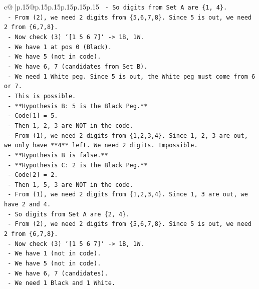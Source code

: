 \documentclass{article}
\begin{document}
{\begin{supertabular}{c@{$\;$}|p{.15\linewidth}@{}p{.15\linewidth}p{.15\linewidth}p{.15\linewidth}p{.15\linewidth}p{.15\linewidth}}
{{{\texttt{        {-}   So digits from Set A are \{1, 4\}.} \\
\texttt{        {-}   From (2), we need 2 digits from \{5,6,7,8\}. Since 5 is out, we need 2 from \{6,7,8\}.} \\
\texttt{        {-}   Now check (3) `{[}1 5 6 7{]}` {-}> 1B, 1W.} \\
\texttt{            {-}   We have 1 at pos 0 (Black).} \\
\texttt{            {-}   We have 5 (not in code).} \\
\texttt{            {-}   We have 6, 7 (candidates from Set B).} \\
\texttt{            {-}   We need 1 White peg. Since 5 is out, the White peg must come from 6 or 7.} \\
\texttt{            {-}   This is possible.} \\
\texttt{    {-}   **Hypothesis B: 5 is the Black Peg.**} \\
\texttt{        {-}   Code{[}1{]} = 5.} \\
\texttt{        {-}   Then 1, 2, 3 are NOT in the code.} \\
\texttt{        {-}   From (1), we need 2 digits from \{1,2,3,4\}. Since 1, 2, 3 are out, we only have **4** left. We need 2 digits. Impossible.} \\
\texttt{        {-}   **Hypothesis B is false.**} \\
\texttt{    {-}   **Hypothesis C: 2 is the Black Peg.**} \\
\texttt{        {-}   Code{[}2{]} = 2.} \\
\texttt{        {-}   Then 1, 5, 3 are NOT in the code.} \\
\texttt{        {-}   From (1), we need 2 digits from \{1,2,3,4\}. Since 1, 3 are out, we have 2 and 4.} \\
\texttt{        {-}   So digits from Set A are \{2, 4\}.} \\
\texttt{        {-}   From (2), we need 2 digits from \{5,6,7,8\}. Since 5 is out, we need 2 from \{6,7,8\}.} \\
\texttt{        {-}   Now check (3) `{[}1 5 6 7{]}` {-}> 1B, 1W.} \\
\texttt{            {-}   We have 1 (not in code).} \\
\texttt{            {-}   We have 5 (not in code).} \\
\texttt{            {-}   We have 6, 7 (candidates).} \\
\texttt{            {-}   We need 1 Black and 1 White.} \\
}}}
\end{supertabular}}
\end{document}
